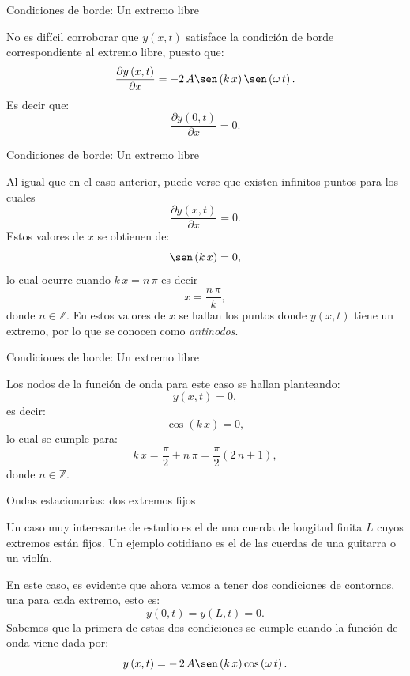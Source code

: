 \documentclass[11pt,handout,aspectratio=1610]{beamer}
\newcommand{\pdiff}[2]{\frac{\partial #1}{\partial #2}}
\newcommand{\zz}{\mathbb{Z}}
\newcommand{\vs}{\vspace{11pt}}
\begin{document}
\begin{frame}{Condiciones de borde: Un extremo libre}

    No es difícil corroborar que $ y \left(x,t\right) $ satisface la condición de borde correspondiente al extremo libre, puesto que: $$ \pdiff{y \left(x,t\right)}{x} = - 2 \, A \sen \left(k \, x\right) \sen \left(\omega \, t\right).  $$ Es decir que: $$ \pdiff{y \left(0,t\right)}{x} = 0. $$ 
        
\end{frame}

\begin{frame}{Condiciones de borde: Un extremo libre}

    Al igual que en el caso anterior, puede verse que existen infinitos puntos para los cuales $$ \pdiff{y \left(x,t\right)}{x} = 0. $$ Estos valores de $x$ se obtienen de: $$ \sen \left(k \, x\right) = 0, $$ lo cual ocurre cuando $ k \, x = n \, \pi $ es decir $$ x = \frac{n \, \pi}{k}, $$ donde $n \in \zz $. En estos valores de $x$ se hallan los puntos donde $ y \left(x,t\right) $ tiene un extremo, por lo que se conocen como \emph{antinodos}.
        
\end{frame}

\begin{frame}{Condiciones de borde: Un extremo libre}

    Los nodos de la función de onda para este caso se hallan planteando: $$ y \left(x,t\right) = 0, $$ es decir: $$ \cos \left(k \, x\right) = 0, $$ lo cual se cumple para: $$ k \, x = \frac{\pi}{2} + n \, \pi = \frac{\pi}{2} \left( 2 \, n + 1\right), $$ donde $n \in \zz $.

\end{frame}

\begin{frame}{Ondas estacionarias: dos extremos fijos}

    Un caso muy interesante de estudio es el de una cuerda de longitud finita $L$ cuyos extremos están fijos. Un ejemplo cotidiano es el de las cuerdas de una guitarra o un violín.

    \vs 

    En este caso, es evidente que ahora vamos a tener dos condiciones de contornos, una para cada extremo, esto es: $$ y \left(0,t\right) = y \left(L,t\right) = 0. $$ Sabemos que la primera de estas dos condiciones se cumple cuando la función de onda viene dada por: $$ y \left(x,t\right) = - \, 2 \, A \sen \left(k \, x\right) \cos \left(\omega \, t\right). $$ 
 
\end{frame}
\end{document}
